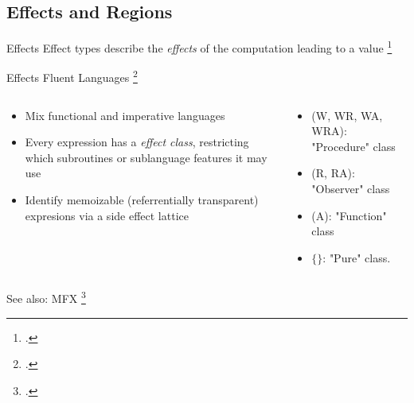 \documentclass[aspectratio=169]{beamer}
\begin{document}
\subsection{Effects and Regions}

\begin{frame}{Effects}
    Effect types describe the \emph{effects} of the computation leading to a value \footcite{pierce_advanced_2005}
    \\
\end{frame}

\begin{frame}{Effects}
    Fluent Languages \footcite{gifford_integrating_1986}
  \begin{columns}[T]
    \begin{column}{0.45\textwidth}
        \begin{itemize}
            \item Mix functional and imperative languages
            \item Every expression has a \emph{effect class}, restricting which subroutines or sublanguage features it may use
            \item Identify memoizable (referrentially transparent) expresions via a side effect lattice %
        \end{itemize}
    \end{column}

    \begin{column}{0.45\textwidth}
    \footnotesize{
        \begin{itemize}
            \item (W, WR, WA, WRA): "Procedure" class
            \item (R, RA): "Observer" class
            \item (A): "Function" class
            \item $\{\}$: "Pure" class.
        \end{itemize}
    }
    \end{column}
  \end{columns}
    See also: MFX \footcite{lucassen_polymorphic_1988}
\end{frame}
\end{document}
